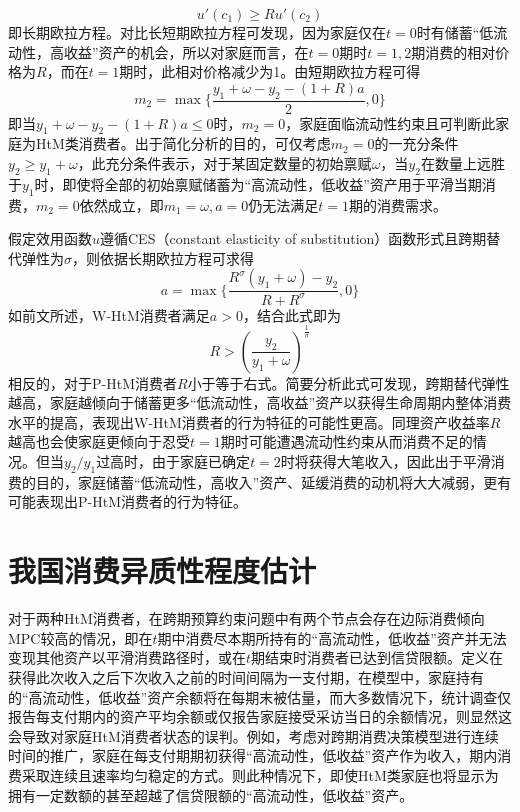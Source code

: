 \documentclass[supercite]{HustGraduPaper}
\begin{document}
    \begin{equation}
    u'(c_1) \geq Ru'(c_2)
    \end{equation}
    即长期欧拉方程。对比长短期欧拉方程可发现，因为家庭仅在$t=0$时有储蓄“低流动性，高收益”资产的机会，所以对家庭而言，在$t=0$期时$t=1,2$期消费的相对价格为$R$，而在$t=1$期时，此相对价格减少为1。由短期欧拉方程可得
    \begin{equation}
    m_2=\max \lbrace \frac{y_1+\omega-y_2-(1+R)a}{2},0 \rbrace
    \end{equation}
    即当$y_1+\omega-y_2-(1+R)a \leq 0$时，$m_2=0$，家庭面临流动性约束且可判断此家庭为HtM类消费者。出于简化分析的目的，可仅考虑$m_2=0$的一充分条件$y_2 \geq y_1+\omega$，此充分条件表示，对于某固定数量的初始禀赋$\omega$，当$y_2$在数量上远胜于$y_1$时，即使将全部的初始禀赋储蓄为“高流动性，低收益”资产用于平滑当期消费，$m_2=0$依然成立，即$m_1=\omega,a=0$仍无法满足$t=1$期的消费需求。

    假定效用函数$u$遵循CES（constant elasticity of substitution）函数形式且跨期替代弹性为$\sigma$，则依据长期欧拉方程可求得
    \begin{equation}
    a=\max \lbrace \frac{R^\sigma (y_1+\omega)-y_2}{R+R^\sigma},0 \rbrace
    \end{equation}
    如前文所述，W-HtM消费者满足$a>0$，结合此式即为
    \begin{equation}
    R>(\frac{y_2}{y_1+\omega})^\frac{1}{\sigma}
    \end{equation}
    相反的，对于P-HtM消费者$R$小于等于右式。简要分析此式可发现，跨期替代弹性越高，家庭越倾向于储蓄更多“低流动性，高收益”资产以获得生命周期内整体消费水平的提高，表现出W-HtM消费者的行为特征的可能性更高。同理资产收益率$R$越高也会使家庭更倾向于忍受$t=1$期时可能遭遇流动性约束从而消费不足的情况。但当$y_2/y_1$过高时，由于家庭已确定$t=2$时将获得大笔收入，因此出于平滑消费的目的，家庭储蓄“低流动性，高收入”资产、延缓消费的动机将大大减弱，更有可能表现出P-HtM消费者的行为特征。
    
    \section{我国消费异质性程度估计}
    对于两种HtM消费者，在跨期预算约束问题中有两个节点会存在边际消费倾向MPC较高的情况，即在$t$期中消费尽本期所持有的“高流动性，低收益”资产并无法变现其他资产以平滑消费路径时，或在$t$期结束时消费者已达到信贷限额。定义在获得此次收入之后下次收入之前的时间间隔为一支付期，在模型中，家庭持有的“高流动性，低收益”资产余额将在每期末被估量，而大多数情况下，统计调查仅报告每支付期内的资产平均余额或仅报告家庭接受采访当日的余额情况，则显然这会导致对家庭HtM消费者状态的误判。例如，考虑对跨期消费决策模型进行连续时间的推广，家庭在每支付期期初获得“高流动性，低收益”资产作为收入，期内消费采取连续且速率均匀稳定的方式。则此种情况下，即使HtM类家庭也将显示为拥有一定数额的甚至超越了信贷限额的“高流动性，低收益”资产。
\end{document}
